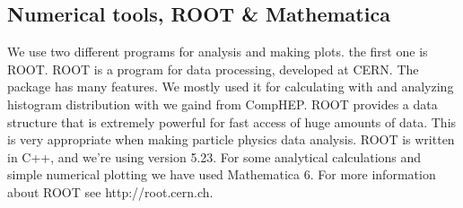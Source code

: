 \subsection{Numerical tools, ROOT \& Mathematica}
We use two different programs for analysis and making plots. the first one is ROOT. ROOT is a program for data processing, developed at CERN. The package has many features. We mostly used it for calculating with and analyzing histogram distribution with we gaind from CompHEP. ROOT provides a data structure that is extremely powerful for fast access of huge amounts of data. This is very appropriate when making particle physics data analysis. ROOT is written in C++, and we're using version 5.23. For some analytical calculations and simple numerical plotting we have used Mathematica 6. For more information about ROOT see http://root.cern.ch.
